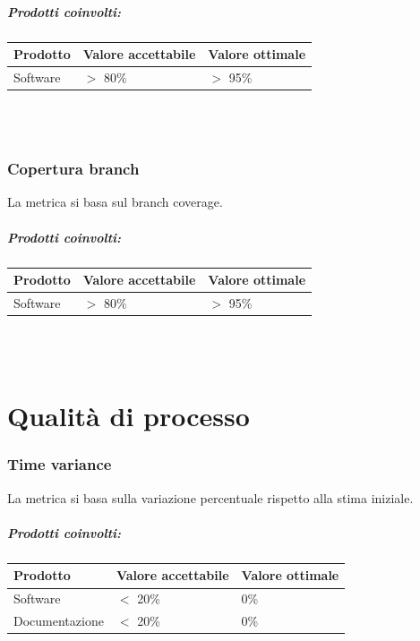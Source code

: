 \documentclass[a4paper, 12pt]{article}
\begin{document}
\subparagraph{Prodotti coinvolti:}
\begin{center}
	\begin{tabularx}{\textwidth}{|X|X|X|}
		\hline
		\textbf{Prodotto} & \textbf{Valore accettabile } & \textbf{Valore ottimale } \\
		\hline
		Software          & $>$ 80\%                     & $>$ 95\%                     \\
		\hline
	\end{tabularx}\\[8pt]
	\mbox{}\\
\end{center}
\subsubsection{Copertura branch}
La metrica si basa sul branch coverage.

\subparagraph{Prodotti coinvolti:}
\begin{center}
	\begin{tabularx}{\textwidth}{|X|X|X|}
		\hline
		\textbf{Prodotto} & \textbf{Valore accettabile } & \textbf{Valore ottimale } \\
		\hline
		Software          & $>$ 80\%                     & $>$ 95\%                     \\
		\hline
	\end{tabularx}\\[8pt]
	\mbox{}\\
\end{center}

\newpage
\section{Qualità di processo}
\subsubsection{Time variance}
La metrica si basa sulla variazione percentuale rispetto alla stima iniziale.

\subparagraph{Prodotti coinvolti:}
\begin{center}
	\begin{tabularx}{\textwidth}{|X|X|X|}
		\hline
		\textbf{Prodotto} & \textbf{Valore accettabile } & \textbf{Valore ottimale } \\
		\hline
		Software          & $<$ 20\%                     & 0\%                       \\
		\hline
		Documentazione    & $<$ 20\%                     & 0\%                       \\
		\hline
	\end{tabularx}\\[8pt]
	\mbox{}\\
\end{center}
\end{document}
